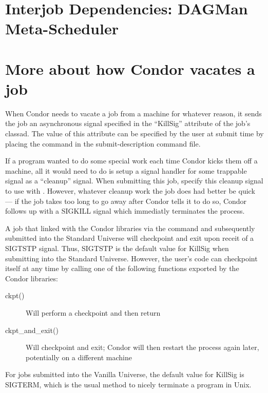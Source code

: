 \section{Interjob Dependencies: DAGMan Meta-Scheduler}
\label{sec:DAGMan}



\section{More about how Condor vacates a job}

When Condor needs to vacate a job from a machine for whatever reason, it
sends the job an asynchronous signal specified in the ``KillSig''
attribute of the job's classad.  The value of this attribute can be specified by
the user at submit time by placing the  command in the
 submit-description command file.  

If a program wanted to do some special work each time
Condor kicks them off a machine, all it would need to do is setup a
signal handler for some trappable signal as a ``cleanup'' signal.  When
submitting this job, specify this cleanup signal to use with
.  However, whatever cleanup work the job does had better be quick
--- if the job takes too long to go away after Condor tells it to do so, Condor
follows up with a SIGKILL signal which immediatly terminates the
process.

A job that linked with the Condor libraries via the 
command and subsequently submitted into the Standard Universe 
will checkpoint and exit upon receit of a SIGTSTP signal.  Thus, SIGTSTP is
the default value for KillSig when submitting into the Standard
Universe.  However, the user's code can checkpoint itself at any time
by calling one of the following functions exported by the Condor libraries:
\begin{description}
\item[ckpt()] Will perform a checkpoint and then return
\item[ckpt\_and\_exit()] Will checkpoint and exit; Condor will then
restart the process again later, potentially on a different machine
\end{description}

For jobs submitted into the Vanilla Universe, the default value for
KillSig is SIGTERM, which is the usual method to nicely terminate a
program in Unix.

